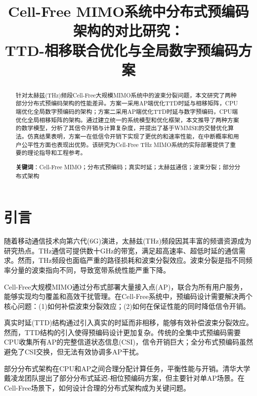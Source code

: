 \documentclass[10pt,twocolumn]{IEEEtran}
\begin{document}
\title{Cell-Free MIMO系统中分布式预编码架构的对比研究：\\TTD-相移联合优化与全局数字预编码方案}

\author{
}

\maketitle

\begin{abstract}
针对太赫兹(THz)频段Cell-Free大规模MIMO系统中的波束分裂问题，本文研究了两种部分分布式预编码架构的性能差异。方案一采用AP端优化TTD时延与相移矩阵，CPU端优化全局数字预编码的架构；方案二采用AP端优化TTD时延与数字预编码，CPU端优化全局相移矩阵的架构。通过建立统一的系统模型和优化框架，本文推导了两种方案的数学模型，分析了其信令开销与计算复杂度，并提出了基于WMMSE的交替优化算法。仿真结果表明，方案一在低信令开销下实现了更优的和速率性能，在中断概率和用户公平性方面也表现出优势。该研究为Cell-Free THz MIMO系统的实际部署提供了重要的理论指导和工程参考。

\textbf{关键词}：Cell-Free MIMO；分布式预编码；真实时延；太赫兹通信；波束分裂；部分分布式架构
\end{abstract}

\section{引言}

随着移动通信技术向第六代(6G)演进，太赫兹(THz)频段因其丰富的频谱资源成为研究热点\cite{ref1}。THz通信可提供数十GHz的带宽，满足超高速率、超低时延的通信需求。然而，THz频段也面临严重的路径损耗和波束分裂效应。波束分裂是指不同频率分量的波束指向不同，导致宽带系统性能严重下降\cite{ref2}。

Cell-Free大规模MIMO通过分布式部署大量接入点(AP)，联合为所有用户服务，能够实现均匀覆盖和高效干扰管理\cite{ref3}。在Cell-Free系统中，预编码设计需要解决两个核心问题：(1)如何补偿波束分裂效应；(2)如何在保证性能的同时降低信令开销。

真实时延(TTD)结构通过引入真实的时延而非相移，能够有效补偿波束分裂效应\cite{ref4}。然而，TTD结构的引入使得预编码设计更加复杂。传统的全集中式预编码需要CPU收集所有AP的完整信道状态信息(CSI)，信令开销巨大；全分布式预编码虽然避免了CSI交换，但无法有效协调多AP干扰\cite{ref5}。

部分分布式架构在CPU和AP之间合理分配计算任务，平衡性能与开销\cite{ref6}。清华大学戴凌龙团队提出了部分分布式延迟-相位预编码方案，但主要针对单AP场景\cite{ref7}。在Cell-Free场景下，如何设计合理的分布式架构成为关键问题。
\end{document}
